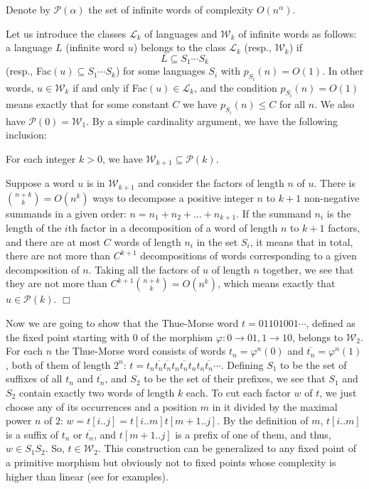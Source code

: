 \documentclass[runningheads,envcountsect,envcountsame]{llncs}
\begin{document}
Denote by $\mathcal P(\alpha)$ the set of infinite words of complexity $O(n^\alpha)$.

Let us introduce the classes $\mathcal L_k$ of languages and $\mathcal W_k$ of infinite words as follows: a language $L$ (infinite word $u$) belongs to the class $\mathcal L_k$ (resp., $\mathcal W_{k}$)
if
\[L \subseteq S_1\cdots S_k\]
(resp., Fac$(u) \subseteq S_1\cdots S_k$) for some
languages $S_i$ with $p_{S_i}(n)=O(1)$.
In other words, $u \in \mathcal W_k$ if and only if Fac$(u) \in
\mathcal L_k$, and the condition $p_{S_i}(n)=O(1)$ means exactly
that for some constant $C$ we have $p_{S_i}(n)\leq C$ for all $n$.
We also have $\mathcal P(0)=\mathcal W_1$. 
By a simple cardinality argument, we have the following inclusion:

\begin{lemma}\label{l1}
 For each integer $k>0$, we have $\mathcal W_{k+1} \subseteq \mathcal P(k)$.
\end{lemma}
 Suppose a word $u$ is in $\mathcal W_{k+1}$
and consider the factors of length $n$ of $u$. There is ${n+k
\choose k}=O(n^{k})$ ways to decompose a positive integer $n$ to
$k+1$ non-negative summands in a given order:
$n=n_1+n_2+\ldots +n_{k+1}$. If the summand $n_i$ is the length of the $i$th factor in a decomposition of a
word of length $n$ to $k+1$ factors, and there are at most $C$
words of length $n_i$ in the set $S_i$, it means that in total,
there are not more than $C^{k+1}$ decompositions of words
corresponding to a given decomposition of $n$. Taking all the
factors of $u$ of length $n$ together, we see that they are not
more than $C^{k+1}{n+k \choose k}=O(n^k)$, which means exactly that $u \in \mathcal P(k)$. \hfill $\Box$


\begin{example} Now we are going to show that the Thue-Morse word $t=01101001\cdots$, defined as the fixed point starting with 0 of the morphism $\varphi: 0\to 01, 1 \to 10$, belongs to  $\mathcal W_2$. For each $n$ the Thue-Morse word consists of words $t_n=\varphi^n(0)$ and $\overline{t_n}=\varphi^n(1)$, both of them of length $2^n$: $t=t_n\overline{t_n}\overline{t_n}t_n \overline{t_n} t_n t_n \overline{t_n}\cdots$. Defining $S_1$ to be the set of suffixes of all $t_n$ and $\overline{t_n}$, and $S_2$ to be the set of their prefixes, we see that $S_1$ and $S_2$ contain exactly two words of length $k$ each. To cut each factor $w$ of $t$, we just choose any of its occurrences and a position $m$ in it divided by the maximal power $n$ of $2$: $w=t[i..j]=t[i..m]t[m+1..j]$. By the definition of $m$, $t[i..m]$ is a suffix of $t_n$ or $\overline{t_n}$, and $t[m+1..j]$ is a prefix of one of them, and thus, $w \in S_1 S_2$. So, $t\in \mathcal W_2$. This construction can be generalized to any fixed point of a 
primitive morphism but obviously not to fixed points whose complexity is higher than linear (see \cite{pansiot} for examples).
\end{example}
\end{document}
